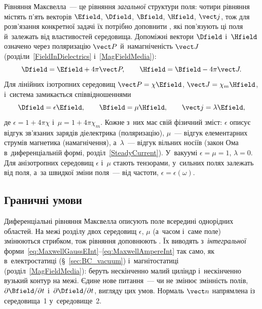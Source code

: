 Рівняння Максвелла~--- це рівняння \emph{загальної} структури поля: чотири рівняння містять п'ять векторів $\Efield$, $\Dfield$, $\Bfield$, $\Hfield$, $\vect j$, тож для розв'язання конкретної задачі їх потрібно доповнити , які пов'язують ці поля й~залежать від властивостей середовища. Допоміжні вектори $\Dfield$ і~$\Hfield$ означено через поляризацію $\vect P$ й~намагніченість $\vect J$ (розділи~\ref{FieldInDielectrics} і~\ref{MagFieldMedia}):
\begin{equation}\label{eq:DHDefinition}
		\Dfield = \Efield + 4\pi\vect P, \qquad \Hfield = \Bfield - 4\pi\vect J.
\end{equation}
Для лінійних ізотропних середовищ $\vect P=\chi\Efield$, $\vect J=\chi_m\Hfield$, і~система замикається співвідношеннями
\begin{equation}\label{eq:ConstitutiveRelations}
		\Dfield = \epsilon\Efield, \qquad \Bfield = \mu\Hfield, \qquad \vect j = \lambda\Efield,
\end{equation}
де $\epsilon=1+4\pi\chi$ і~$\mu=1+4\pi\chi_m$. Кожне з~них має свій фізичний зміст: $\epsilon$ описує відгук зв'язаних зарядів діелектрика (поляризацію), $\mu$~--- відгук елементарних струмів магнетика (намагнічення), а~$\lambda$~--- відгук вільних носіїв (закон Ома в~диференціальній формі, розділ~\ref{SteadyCurrent}). У~вакуумі $\epsilon=\mu=1$, $\lambda=0$. Для анізотропних середовищ $\epsilon$ і~$\mu$ стають тензорами, у~сильних полях залежать від поля, а~за швидкої зміни поля~--- від частоти, $\epsilon=\epsilon(\omega)$.


\subsection*{Граничні умови}


Диференціальні рівняння Максвелла описують поле всередині однорідних областей. На межі розділу двох середовищ $\epsilon$, $\mu$ (а~часом і~саме поле) змінюються стрибком, тож рівняння доповнюють . Їх виводять з~\emph{інтегральної} форми~\eqref{eq:MaxwellGaussEInt}--\eqref{eq:MaxwellAmpereInt} так само, як в~електростатиці (\S~\ref{sec:BC_vacuum}) і~магнітостатиці (розділ~\ref{MagFieldMedia}): беруть нескінченно малий циліндр і~нескінченно вузький контур на межі. Єдине нове питання~--- чи не змінює змінність полів, $\partial\Bfield/\partial t$ і~$\partial\Dfield/\partial t$, вигляду цих умов. Нормаль $\vect n$ напрямлена із середовища~1 у~середовище~2.


